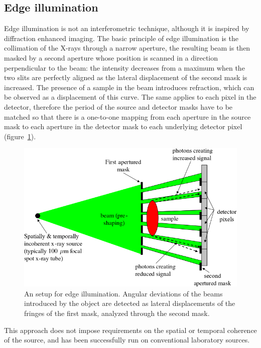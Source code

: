 \subsection{Edge illumination}
Edge illumination is not an interferometric technique, although it is
inspired by diffraction enhanced imaging. The basic principle of edge
illumination is the collimation of the X-rays through a narrow aperture,
the resulting beam is then masked by a second aperture whose position is
scanned in a direction perpendicular to the beam: the intensity decreases from a
maximum when the two slits are perfectly aligned as the lateral displacement
of the second mask is increased.
The presence of a sample in the beam introduces refraction, which can be
observed as a displacement of this curve. The same applies to each pixel in
the detector, therefore the period of the source and detector masks have to
be matched so that there is a one-to-one mapping from each aperture in the
source mask to each aperture in the detector mask to each underlying
detector pixel (figure~\ref{fig:edge-illumination}).

\begin{figure}[htb]
    \centering
    \includegraphics[width=\textwidth]{gfx/edgeillumination.png}
    \caption[Edge illumination.]{An setup for edge illumination\cn. Angular
        deviations of the beams introduced by the object are detected as
        lateral displacements of the fringes of the first mask, analyzed
        through the second mask.}
    \label{fig:edge-illumination}
\end{figure}



This approach does not impose requirements on the spatial or temporal
coherence of the source, and has been successfully run on conventional
laboratory sources.

